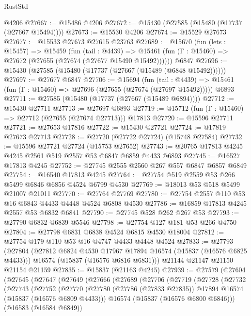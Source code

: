 \begin{lexlean}{RustStd}
\begin{coremodule}
{\begin{coremodule}
{{{{{{{{{{{{{{{{{{{{{{{{{{{{{{{{{{{{{{{{{{{{{{{{{{{{{{{{{{{{    @4206
@27667 := @15486 @4206
@27672 := @15430 (@27585 (@15480 (@17737 (@27667 @15494))))
@27673 := @15530 @4206
@27674 := @15529 @27673
@27677 := @15533 @27673 @27615 @23763
@27689 := @15670
    (fun (lets : @15457) =>
    @15459
      (fun (tail : @4439) =>
      @15461 (fun (Γ : @15460) => @27672 (@27655 (@27674 (@27677 @15490 @15492))))))
    @6847
@27696 := @15430 (@27585 (@15480 (@17737 (@27667 (@15489 (@6848 @15492))))))
@27697 := @27677 @6847
@27706 := @15694
    (fun (tail : @4439) => @15461 (fun (Γ : @15460) => @27696 (@27655 (@27674 (@27697 @15492)))))
    @6893
@27711 := @27585 (@15480 (@17737 (@27667 (@15489 @6894))))
@27712 := @15430 @27711
@27713 := @27697 @6893
@27719 := @15712 (fun (Γ : @15460) => @27712 (@27655 (@27674 @27713))) @17813
@27720 := @15596 @27711
@27721 := @27653 @17816
@27722 := @15430 @27721
@27724 := @17819 @27673 @27713
@27728 := @27720 (@27722 @27724) (@15748 @27584)
@27732 := @15596 @27721 @27724 (@15753 @27652)
@27743 := @20765 @17813 @4245 @4245 @2561 @519 @2557 @53 @6847 @6859 @4433 @6893
@27745 := @16527 @17813 @4245
@27752 := @27745 @2555 @2560 @267 @557 @6847 @6857 @6849
@27754 := @16540 @17813 @4245
@27764 := @27754 @519 @2559 @53 @266 @5499 @6846 @6856 @4524 @6799 @4530
@27769 := @18013 @53 @518 @5499 @21007 @21011
@27770 := @27764 @27769
@27780 := @27754 @2557 @110 @53 @16 @6843 @4433 @4448 @4524 @6808 @4530
@27786 := @16859 @17813 @4245 @2557 @53 @6832 @6841
@27790 := @27745 @528 @262 @267 @53
@27793 := @27790 @6832 @6839 @5546
@27798 := @27754 @127 @181 @53 @266 @4750
@27804 := @27798 @6831 @6838 @4524 @6815 @4530 @18004
@27812 := @27754 @179 @110 @53 @16 @4747 @4433 @4448 @4524
@27833 := @27793
    (@27804
      (@27812 @6824 @4530 @17967 @17894 @16574 (@15837 (@16576 @6825 @4433)))
      @16574
      (@15837 (@16576 @6816 @6831)))
    @21144
    @21147
    @21150
    @21154
    @21159
@27835 := @15837 (@21163 @4245)
@27939 := @27579
    (@27604
      (@27645
        (@27647
          (@27649
            (@27666
              (@27689
                (@27706
                  (@27719
                    (@27728
                      (@27732
                        (@27743
                          (@27752
                            (@27770
                              (@27780
                                (@27786 (@27833 @27835))
                                @17894
                                @16574
                                (@15837 (@16576 @6809 @4433)))
                              @16574
                              (@15837 (@16576 @6800 @6846)))
                            (@16583 (@16584 @6849))
}}}}}}}}}}}}}}}}}}}}}}}}}}}}}}}}}}}}}}}}}}}}}}}}}}}}}}}}}}}}
\end{coremodule}}
\end{coremodule}
\end{lexlean}
